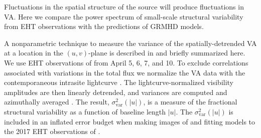Fluctuations in the spatial structure of the source will produce fluctuations in VA.  Here we compare  the power spectrum of small-scale structural variability from EHT observations with the predictions of GRMHD models.


A nonparametric technique to measure the variance of the spatially-detrended VA at a location in the $(u,v)$-plane is described in \citet{NoiseModeling} and briefly summarized here.  We use EHT observations of \sgra from April 5, 6, 7, and 10.  To exclude correlations associated with  variations in the total flux we normalize the VA data with the contemporaneous intrasite lightcurve \citep{Georgiev_2022}.  The lightcurve-normalized visibility amplitudes are then linearly detrended, and variances are computed and azimuthally averaged \citep{NoiseModeling}.  The result, $\sigma_\text{var}^2 (|u|)$, is a measure of the fractional structural variability as a function of baseline length $|u|$.  The $\sigma_\text{var}^2 (|u|)$ is included in an inflated error budget when making images of and fitting models to the 2017 EHT observations of \sgra {}.

